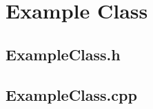 \documentclass[12pt]{article}
\newcommand{\EXCISE}[1]{}
\begin{document}
\EXCISE{

\section{Documentation}
All documentation should be done with DOxygen. DOxygen standards used within PMPL are not decided upon yet.

\section{Testing}
Currently only nightly compilation testing occurs nightly. This should be expanded in the future.

}

\section{Example Class}
\subsection{ExampleClass.h}


\subsection{ExampleClass.cpp}

\end{document}
